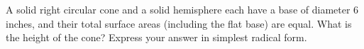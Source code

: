 A solid right circular cone and a solid hemisphere each have a base of diameter $6$ inches, and their total surface areas (including the flat base) are equal. What is the height of the cone? Express your answer in simplest radical form.
